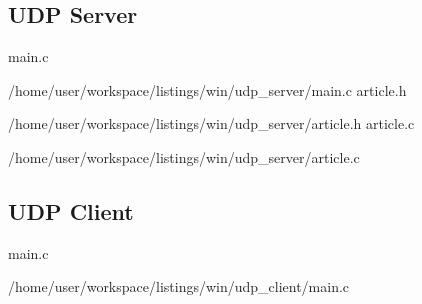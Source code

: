 \documentclass[12pt,a4paper]{report}
\begin{document}
\subsection*{UDP Server}
main.c

{/home/user/workspace/listings/win/udp_server/main.c}
article.h

{/home/user/workspace/listings/win/udp_server/article.h}
article.c

{/home/user/workspace/listings/win/udp_server/article.c}
\subsection*{UDP Client}
main.c

{/home/user/workspace/listings/win/udp_client/main.c}
%
\end{document}
